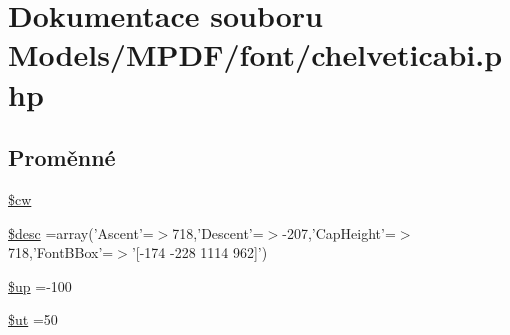 \hypertarget{chelveticabi_8php}{\section{Dokumentace souboru Models/\-M\-P\-D\-F/font/chelveticabi.php}
\label{chelveticabi_8php}
}
\subsection*{Proměnné}
\begin{DoxyCompactItemize}
\item 
\hyperlink{chelveticabi_8php_ac2951b03dbb0317e6c61ec920b7479dc}{\$cw}
\item 
\hyperlink{chelveticabi_8php_a31059b9e4d0c5af34df20da32232ea9a}{\$desc} =array('Ascent'=$>$718,'Descent'=$>$-\/207,'Cap\-Height'=$>$718,'Font\-B\-Box'=$>$'\mbox{[}-\/174 -\/228 1114 962\mbox{]}')
\item 
\hyperlink{chelveticabi_8php_a6b5ad2ac55f9df46e8f34e78fbd6f176}{\$up} =-\/100
\item 
\hyperlink{chelveticabi_8php_aadd3f841051043ee58e587e840e8dd0b}{\$ut} =50
\item 

\end{DoxyCompactItemize}
